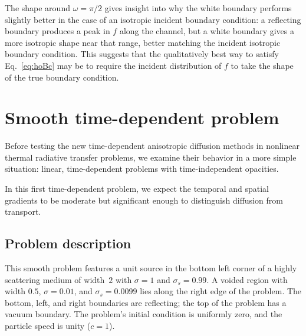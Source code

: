 \begin{figure}[htb]
  \centering\small
  \subfloat[Isotropic]{%
  \label{fig:bcChannelIsotropicAngular}
  \vspace{-.25in}%
  }%
  \subfloat[Normal]{%
  \label{fig:bcChannelDeltaAngular}
  \vspace{-.25in}%
  }%
  \label{fig:bcChannelAngular}
\end{figure}

The shape around $\omega=\pi/2$ gives insight into why the white boundary
performs slightly better in the case of an isotropic incident boundary
condition: a reflecting boundary produces a peak in $f$
along the channel, but a white boundary gives a more isotropic shape near that
range, better matching the incident isotropic boundary condition. This suggests
that the qualitatively best way to satisfy Eq.~\eqref{eq:hoBc} may be
to require the incident distribution of $f$ to take the shape of the true
boundary condition.

\section{Smooth time-dependent problem}

Before testing the new time-dependent anisotropic diffusion methods in
nonlinear thermal radiative transfer problems, we
examine their behavior in a more simple
situation: linear, time-dependent problems with time-independent opacities.

In this first time-dependent problem, we expect the temporal and spatial
gradients to be moderate but significant enough to distinguish diffusion from
transport.

\subsection{Problem description}

This smooth problem features a unit source in the bottom left corner of a
highly scattering medium of width~$2$ with
$\sigma=1$ and $\sigma_s=0.99$. A voided region with width $0.5$,
$\sigma=0.01$, and $\sigma_s=0.0099$ lies along the right edge of the problem.
The bottom,
left, and right boundaries are reflecting; the top of the problem has a vacuum
boundary. The problem's initial condition is uniformly zero, and the particle
speed is unity ($c=1$).

